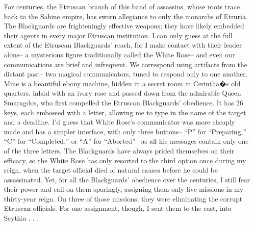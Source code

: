 \documentclass[char]{Kos}
\begin{document}
For centuries, the Etruscan branch of this band of assassins, whose roots trace back to the Sabine empire, has sworn allegiance to only the monarchs of Etruria. The Blackguards are frighteningly effective weapons; they have likely embedded their agents in every major Etruscan institution. I can only guess at the full extent of the Etruscan Blackguards' reach, for I make contact with their leader alone-- a mysterious figure traditionally called the White Rose-- and even our communications are brief and infrequent. We correspond using artifacts from the distant past-- two magical communicators, tuned to respond only to one another. Mine is a beautiful ebony machine, hidden in a secret room in Cerintha�s old quarters. inlaid with an ivory rose and passed down from the admirable Queen Smaragdos, who first compelled the Etruscan Blackguards' obedience. It has 26 keys, each embossed with a letter, allowing me to type in the name of the target and a deadline. I'd guess that White Rose's communicator was more cheaply made and has a simpler interface, with only three buttons-- ``P'' for ``Preparing,'' ``C'' for ``Completed,'' or ``A'' for ``Aborted''-- as all his messages contain only one of the three letters. The Blackguards have always prided themselves on their efficacy, so the White Rose has only resorted to the third option once during my reign, when the target official died of natural causes before he could be assassinated. Yet, for all the Blackguards' obedience over the centuries, I still fear their power and call on them sparingly, assigning them only five missions in my thirty-year reign. On three of those missions, they were eliminating the corrupt Etruscan officials. For one assignment, though, I sent them to the east, into Scythia . . .
\end{document}
